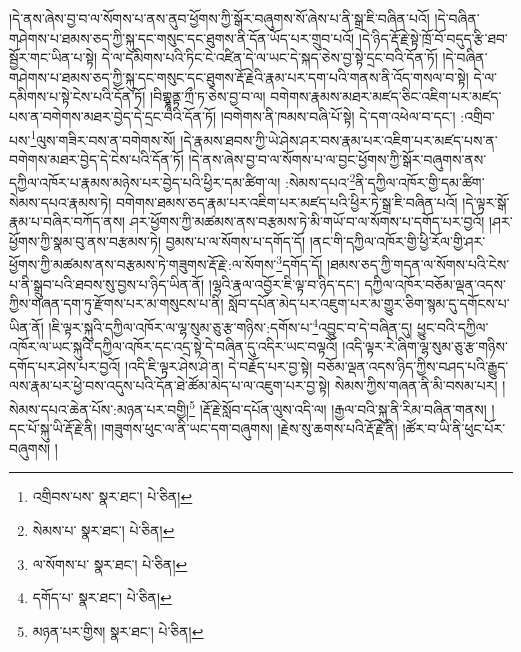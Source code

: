 །དེ་ནས་ཞེས་བྱ་བ་ལ་སོགས་པ་ནས་ནུབ་ཕྱོགས་ཀྱི་སྒོར་བཞུགས་སོ་ཞེས་པ་ནི་སྒྲ་ཇི་བཞིན་པའོ། །དེ་བཞིན་གཤེགས་པ་ཐམས་ཅད་ཀྱི་སྐུ་དང་གསུང་དང་ཐུགས་ནི་དོན་ཡོད་པར་གྲུབ་པའོ། །དེ་ཉིད་རྡོ་རྗེ་སྟེ་ཁྲོ་བོ་བདུད་རྩི་ཐབ་སྦྱོར་གང་ཡིན་པ་སྟེ། དེ་ལ་དམིགས་པའི་ཏིང་ངེ་འཛིན་དེ་ལ་ཡང་དེ་སྐད་ཅེས་བྱ་སྟེ་དྲང་བའི་དོན་ཏོ། །དེ་བཞིན་གཤེགས་པ་ཐམས་ཅད་ཀྱི་སྐུ་དང་གསུང་དང་ཐུགས་རྡོ་རྗེའི་རྣམ་པར་དག་པའི་གནས་ནི་འོད་གསལ་བ་སྟེ། དེ་ལ་དམིགས་པ་སྟེ་ངེས་པའི་དོན་ཏོ། །བིགྷྣཱནྟ་ཀྲྀ་ཏ་ཅེས་བྱ་བ་ལ། བགེགས་རྣམས་མཐར་མཛད་ཅིང་འཇིག་པར་མཛད་པས་ན་བགེགས་མཐར་བྱེད་དེ་དྲང་བའི་དོན་ཏོ། །བགེགས་ནི་ཁམས་བཞི་པོ་སྟེ། དེ་དག་འཕེལ་བ་དང་། :འགྲིབ་པས་\footnote{འགྲིབས་པས་  སྣར་ཐང་།  པེ་ཅིན། }ལུས་གཟིར་བས་ན་བགེགས་སོ། །དེ་རྣམས་ཐབས་ཀྱི་ཡེ་ཤེས་ཤར་བས་རྣམ་པར་འཇིག་པར་མཛད་པས་ན་བགེགས་མཐར་བྱེད་དེ་ངེས་པའི་དོན་ཏོ། །དེ་ནས་ཞེས་བྱ་བ་ལ་སོགས་པ་ལ་བྱང་ཕྱོགས་ཀྱི་སྒོར་བཞུགས་ནས་དཀྱིལ་འཁོར་པ་རྣམས་མཉེས་པར་བྱེད་པའི་ཕྱིར་དམ་ཚིག་ལ། :སེམས་དཔའ་\footnote{སེམས་པ་  སྣར་ཐང་།  པེ་ཅིན། }ནི་དཀྱིལ་འཁོར་གྱི་དམ་ཚིག་སེམས་དཔའ་རྣམས་ཏེ། བགེགས་ཐམས་ཅད་རྣམ་པར་འཇིག་པར་མཛད་པའི་ཕྱིར་ཏེ་སྒྲ་ཇི་བཞིན་པའོ། །དེ་ལྟར་སྒོ་རྣམ་པ་བཞིར་བཀོད་ནས། ཤར་ཕྱོགས་ཀྱི་མཚམས་ནས་བརྩམས་ཏེ་མི་གཡོ་བ་ལ་སོགས་པ་དགོད་པར་བྱའོ། །ཤར་ཕྱོགས་ཀྱི་སྣམ་བུ་ནས་བརྩམས་ཏེ། བྱམས་པ་ལ་སོགས་པ་དགོད་དོ། །ནང་གི་དཀྱིལ་འཁོར་གྱི་ཕྱི་རོལ་གྱི་ཤར་ཕྱོགས་ཀྱི་མཚམས་ནས་བརྩམས་ཏེ་གཟུགས་རྡོ་རྗེ་:ལ་སོགས་\footnote{ལ་སོགས་པ་  སྣར་ཐང་།  པེ་ཅིན། }དགོད་དོ། །ཐམས་ཅད་ཀྱི་གདན་ལ་སོགས་པའི་ངེས་པ་ནི་སྒྲུབ་པའི་ཐབས་སུ་བྱས་པ་ཉིད་ཡིན་ནོ། །ལྷའི་རྣལ་འབྱོར་ཇི་ལྟ་བ་ཉིད་དང་། དཀྱིལ་འཁོར་བཅོམ་ལྡན་འདས་ཀྱིས་གཞན་དག་ཏུ་རྫོགས་པར་མ་གསུངས་པ་ནི། སློབ་དཔོན་མེད་པར་འཇུག་པར་མ་གྱུར་ཅིག་སྙམ་དུ་དགོངས་པ་ཡིན་ནོ། །ཇི་ལྟར་སྐུའི་དཀྱིལ་འཁོར་ལ་ལྷ་སུམ་ཅུ་རྩ་གཉིས་:དགོས་པ་\footnote{དགོད་པ་  སྣར་ཐང་།  པེ་ཅིན། }འབྱུང་བ་དེ་བཞིན་དུ། ཕྱུང་བའི་དཀྱིལ་འཁོར་ལ་ཡང་སྐུའི་དཀྱིལ་འཁོར་དང་འདྲ་སྟེ་དེ་བཞིན་དུ་འདིར་ཡང་བལྟའོ། །འདི་ལྟར་རེ་ཞིག་ལྷ་སུམ་ཅུ་རྩ་གཉིས་དགོད་པར་ཤེས་པར་བྱའོ། །འདི་ཇི་ལྟར་ཤེས་ཤེ་ན། དེ་བརྗོད་པར་བྱ་སྟེ། བཅོམ་ལྡན་འདས་ཉིད་ཀྱིས་བཤད་པའི་རྒྱུད་ལས་རྣམ་པར་ཕྱེ་བས་འདུས་པའི་དོན་ཐེ་ཚོམ་མེད་པ་ལ་འཇུག་པར་བྱ་སྟེ། སེམས་ཀྱིས་གཞན་ནི་མི་བསམ་པར། །སེམས་དཔའ་ཆེན་པོས་:མཉན་པར་བགྱི།\footnote{མཉན་པར་གྱིས།  སྣར་ཐང་།  པེ་ཅིན། } །རྡོ་རྗེ་སློབ་དཔོན་ལུས་འདི་ལ། །རྒྱལ་བའི་སྐུ་ནི་རིམ་བཞིན་གནས། །དང་པོ་སྐུ་ཡི་རྡོ་རྗེ་ནི། །གཟུགས་ཕུང་ལ་ནི་ཡང་དག་བཞུགས། །རྗེས་སུ་ཆགས་པའི་རྡོ་རྗེ་ནི། །ཚོར་བ་ཡི་ནི་ཕུང་པོར་བཞུགས། །
